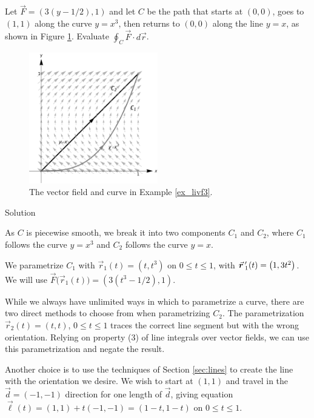 \begin{example}\label{ex_livf3}
Let $\vec F = \left( 3(y-1/2),1\right)$ and let $C$ be the path that starts at $(0,0)$, goes to $(1,1)$ along the curve $y=x^3$, then returns to $(0,0)$ along the line $y=x$, as shown in Figure \ref{fig_Vector_Calc_10}. Evaluate $\oint_C \vec F\cdot d\vec r$.


\begin{figure}[H]
	\begin{center}
			\includegraphics[width=0.5\textwidth]{fig_Vector_Calc_10}
	\caption{The vector field and curve in Example \ref{ex_livf3}.}
	\label{fig_Vector_Calc_10}
	\end{center}
\end{figure}


Solution 

As $C$ is piecewise smooth, we break it into two components $C_1$ and $C_2$, where $C_1$ follows the curve $y=x^3$ and $C_2$ follows the curve $y=x$. 

We parametrize $C_1$ with $\vec r_1(t) = \left( t, t^3\right)$ on $0\leq t\leq 1$, with $\vrp_1(t) = \left( 1,3t^2\right)$. We will use \linebreak $\vec F\big(\vec r_1(t)\big) = \left( 3(t^3-1/2),1\right)$.

While we always have unlimited ways in which to parametrize a curve, there are two direct methods to choose from when parametrizing $C_2$. The parametrization $\vec r_2(t)=\left( t,t\right)$, $0\leq t\leq 1$ traces the correct line segment but with the wrong orientation. Relying on property (3) of line integrals over vector fields, we can use this parametrization and negate the result.

Another choice is to use the techniques of Section \ref{sec:lines} to create the line with the orientation we desire. We wish to start at $( 1,1)$ and travel in the $\vec d = \left( -1,-1\right)$ direction for one length of $\vec d$, giving equation $\vec \ell(t) = \left( 1,1\right) + t\left( -1,-1\right) = \left( 1-t,1-t\right)$ on $0\leq t\leq 1$.


\end{example}
